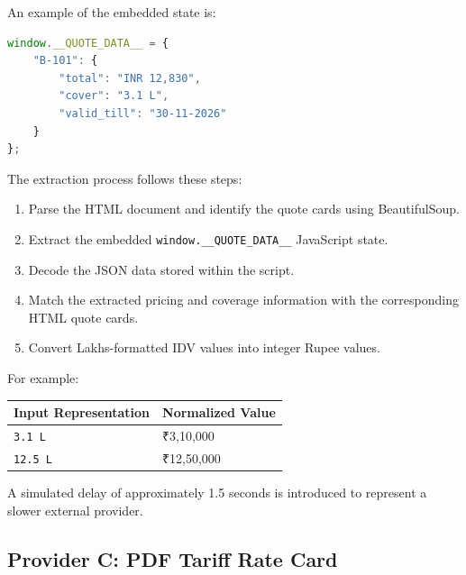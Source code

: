 \documentclass[11pt,a4paper]{article}
\begin{document}
An example of the embedded state is:

\begin{lstlisting}[language=javascript,caption={Example of Provider B hydrated quote data}]
window.__QUOTE_DATA__ = {
    "B-101": {
        "total": "INR 12,830",
        "cover": "3.1 L",
        "valid_till": "30-11-2026"
    }
};
\end{lstlisting}

The extraction process follows these steps:

\begin{enumerate}

    \item Parse the HTML document and identify the quote cards
    using BeautifulSoup.

    \item Extract the embedded
    \texttt{window.\_\_QUOTE\_DATA\_\_} JavaScript state.

    \item Decode the JSON data stored within the script.

    \item Match the extracted pricing and coverage information
    with the corresponding HTML quote cards.

    \item Convert Lakhs-formatted IDV values into integer
    Rupee values.

\end{enumerate}

For example:

\begin{center}
\begin{tabular}{@{}ll@{}}
\toprule
\textbf{Input Representation} & \textbf{Normalized Value} \\
\midrule
\texttt{3.1 L} & ₹3,10,000 \\
\texttt{12.5 L} & ₹12,50,000 \\
\bottomrule
\end{tabular}
\end{center}

A simulated delay of approximately 1.5 seconds is introduced
to represent a slower external provider.


\subsection{Provider C: PDF Tariff Rate Card}
\end{document}
